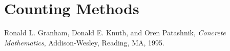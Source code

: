 \documentclass{book}
\begin{document}
	\section{Counting Methods}


\begin{thebibliography}{9}
		Ronald L.   Granham, Donald E.  Knuth, and Oren Patashnik,
		\textit{Concrete Mathematics},
		Addison-Wesley, Reading, MA, 1995.
	\end{thebibliography}
\end{document}
